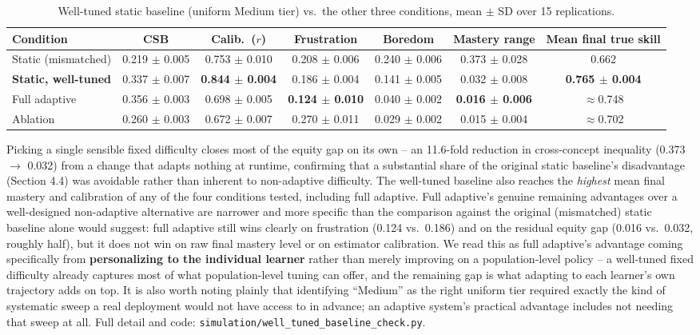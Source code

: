 \documentclass[11pt]{article}
\begin{document}
\begin{table}[h]
\centering
\caption{Well-tuned static baseline (uniform Medium tier) vs.\ the other three conditions, mean $\pm$ SD over 15 replications.}
\label{tab:table4}
\begin{tabular}{@{}lcccccc@{}}
\toprule
Condition & CSB & Calib.\ ($r$) & Frustration & Boredom & Mastery range & Mean final true skill \\
\midrule
Static (mismatched) & 0.219 $\pm$ 0.005 & 0.753 $\pm$ 0.010 & 0.208 $\pm$ 0.006 & 0.240 $\pm$ 0.006 & 0.373 $\pm$ 0.028 & 0.662 \\
\textbf{Static, well-tuned} & 0.337 $\pm$ 0.007 & \textbf{0.844 $\pm$ 0.004} & 0.186 $\pm$ 0.004 & 0.141 $\pm$ 0.005 & 0.032 $\pm$ 0.008 & \textbf{0.765 $\pm$ 0.004} \\
Full adaptive & 0.356 $\pm$ 0.003 & 0.698 $\pm$ 0.005 & \textbf{0.124 $\pm$ 0.010} & 0.040 $\pm$ 0.002 & \textbf{0.016 $\pm$ 0.006} & $\approx$0.748 \\
Ablation & 0.260 $\pm$ 0.003 & 0.672 $\pm$ 0.007 & 0.270 $\pm$ 0.011 & 0.029 $\pm$ 0.002 & 0.015 $\pm$ 0.004 & $\approx$0.702 \\
\bottomrule
\end{tabular}
\end{table}

Picking a single sensible fixed difficulty closes most of the equity gap on its own -- an 11.6-fold reduction in cross-concept inequality (0.373 $\to$ 0.032) from a change that adapts nothing at runtime, confirming that a substantial share of the original static baseline's disadvantage (Section 4.4) was avoidable rather than inherent to non-adaptive difficulty. The well-tuned baseline also reaches the \textit{highest} mean final mastery and calibration of any of the four conditions tested, including full adaptive. Full adaptive's genuine remaining advantages over a well-designed non-adaptive alternative are narrower and more specific than the comparison against the original (mismatched) static baseline alone would suggest: full adaptive still wins clearly on frustration (0.124 vs.\ 0.186) and on the residual equity gap (0.016 vs.\ 0.032, roughly half), but it does not win on raw final mastery level or on estimator calibration. We read this as full adaptive's advantage coming specifically from \textbf{personalizing to the individual learner} rather than merely improving on a population-level policy -- a well-tuned fixed difficulty already captures most of what population-level tuning can offer, and the remaining gap is what adapting to each learner's own trajectory adds on top. It is also worth noting plainly that identifying ``Medium'' as the right uniform tier required exactly the kind of systematic sweep a real deployment would not have access to in advance; an adaptive system's practical advantage includes not needing that sweep at all. Full detail and code: \texttt{simulation/well\_tuned\_baseline\_check.py}.
\end{document}

